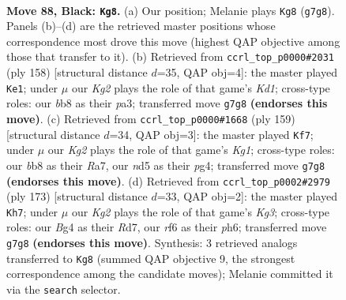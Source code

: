 \documentclass[11pt]{article}
\begin{document}
\clearpage

\begin{figure}[p]\centering
\begin{subfigure}{0.46\textwidth}\centering
\resizebox{\linewidth}{!}{%
\newchessgame
\chessboard[
  setfen={1B6/6k1/5R2/1P1N4/P3B1b1/3K3p/8/6r1 b - - 16 88},
  showmover=false,
  pgfstyle=straightmove, color=movearrow, markmove={g7-g8}
]}
\caption{}
\end{subfigure}\hfill
\begin{subfigure}{0.46\textwidth}\centering
\resizebox{\linewidth}{!}{%
\newchessgame
\chessboard[
  setfen={8/8/1k6/2b5/5R2/pB6/P6r/3K4 w - - 17 80},
  showmover=false,
  pgfstyle=straightmove, color=movearrow, markmove={d1-e1}
]}
\caption{}
\end{subfigure}
\\[4pt]
\begin{subfigure}{0.46\textwidth}\centering
\resizebox{\linewidth}{!}{%
\newchessgame
\chessboard[
  setfen={6k1/r7/2R4p/6bP/p5P1/B7/1K6/8 b - - 8 80},
  showmover=false,
  pgfstyle=straightmove, color=movearrow, markmove={g8-f7}
]}
\caption{}
\end{subfigure}\hfill
\begin{subfigure}{0.46\textwidth}\centering
\resizebox{\linewidth}{!}{%
\newchessgame
\chessboard[
  setfen={8/3r4/6kP/8/2b3p1/4B1P1/1R6/2K5 b - - 32 87},
  showmover=false,
  pgfstyle=straightmove, color=movearrow, markmove={g6-h7}
]}
\caption{}
\end{subfigure}
\caption{\textbf{Move 88, Black: \texttt{Kg8}.} (a) Our position; Melanie plays \texttt{Kg8} (\texttt{g7g8}). Panels (b)--(d) are the retrieved master positions whose correspondence most drove this move (highest QAP objective among those that transfer to it). (b) Retrieved from \texttt{ccrl\_top\_p0000\#2031} (ply 158) [structural distance $d$=35, QAP obj=4]: the master played \texttt{Ke1}; under $\mu$ our \emph{Kg2} plays the role of that game's \emph{Kd1}; cross-type roles: our \emph{b}b8 as their \emph{p}a3; transferred move \texttt{g7g8} \textbf{(endorses this move)}. (c) Retrieved from \texttt{ccrl\_top\_p0000\#1668} (ply 159) [structural distance $d$=34, QAP obj=3]: the master played \texttt{Kf7}; under $\mu$ our \emph{Kg2} plays the role of that game's \emph{Kg1}; cross-type roles: our \emph{b}b8 as their \emph{R}a7, our \emph{n}d5 as their \emph{p}g4; transferred move \texttt{g7g8} \textbf{(endorses this move)}. (d) Retrieved from \texttt{ccrl\_top\_p0002\#2979} (ply 173) [structural distance $d$=33, QAP obj=2]: the master played \texttt{Kh7}; under $\mu$ our \emph{Kg2} plays the role of that game's \emph{Kg3}; cross-type roles: our \emph{B}g4 as their \emph{R}d7, our \emph{r}f6 as their \emph{p}h6; transferred move \texttt{g7g8} \textbf{(endorses this move)}. Synthesis: 3 retrieved analogs transferred to \texttt{Kg8} (summed QAP objective 9, the strongest correspondence among the candidate moves); Melanie committed it via the \texttt{search} selector.}
\label{fig:thought-m175}
\end{figure}
\end{document}
